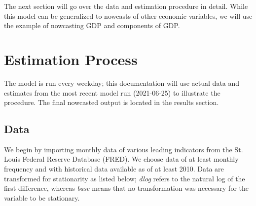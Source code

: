 \documentclass[11pt, letterpaper]{article}\usepackage[]{graphicx}\usepackage[]{color}
\begin{document}
The next section will go over the data and estimation procedure in detail. While this model can be generalized to nowcasts of other economic variables, we will use the example of nowcasting GDP and components of GDP.

\newpage
\section{Estimation Process}
The model is run every weekday; this documentation will use actual data and estimates from the most recent model run (2021-06-25) to illustrate the procedure. The final nowcasted output is located in the results section.

\subsection{Data}
We begin by importing monthly data of various leading indicators from the St. Louis Federal Reserve Database (FRED). We choose data of at least monthly frequency and with historical data available as of at least 2010. Data are transformed for stationarity as listed below; \textit{dlog} refers to the natural log of the first difference, whereas \textit{base} means that no transformation was necessary for the variable to be stationary.
\end{document}
